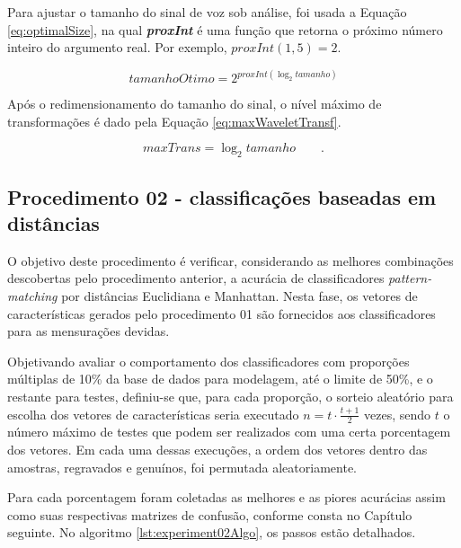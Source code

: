 		\par Para ajustar o tamanho do sinal de voz sob análise, foi usada a Equação \ref{eq:optimalSize}, na qual \textit{\textbf{proxInt}} é uma função que retorna o próximo número inteiro do argumento real. Por exemplo, $proxInt(1,5) = 2$.

		\begin{equation}
					tamanhoOtimo=2^{proxInt(\log_{2}tamanho)}
					\label{eq:optimalSize}
		\end{equation} 
		
		\par Após o redimensionamento do tamanho do sinal, o nível máximo de transformações é dado pela Equação \ref{eq:maxWaveletTransf}. 
				
		\begin{equation}
					maxTrans=\log_{2}tamanho \qquad.
					\label{eq:maxWaveletTransf}
		\end{equation}
		
		\subsection{Procedimento 02 - classificações baseadas em distâncias}
		\label{chap:propApproach:sec:Experimento02}
		\par O objetivo deste procedimento é verificar, considerando as melhores combinações descobertas pelo procedimento anterior, a acurácia de classificadores \textit{pattern-matching} por distâncias Euclidiana e Manhattan. Nesta fase, os vetores de características gerados pelo procedimento 01 são fornecidos aos classificadores para as mensurações devidas.
				
		\par Objetivando avaliar o comportamento dos classificadores com proporções múltiplas de 10\% da base de dados para modelagem, até o limite de 50\%, e o restante para testes, definiu-se que, para cada proporção, o sorteio aleatório para escolha dos vetores de características seria executado $n=t \cdot \frac{t+1}{2}$ vezes, sendo $t$ o número máximo de testes que podem ser realizados com uma certa porcentagem dos vetores. Em cada uma dessas execuções, a ordem dos vetores dentro das amostras, regravados e genuínos, foi permutada aleatoriamente.
				
		\par Para cada porcentagem foram coletadas as melhores e as piores acurácias assim como suas respectivas matrizes de confusão, conforme consta no Capítulo seguinte. No algoritmo \ref{lst:experiment02Algo}, os passos estão detalhados.
		
